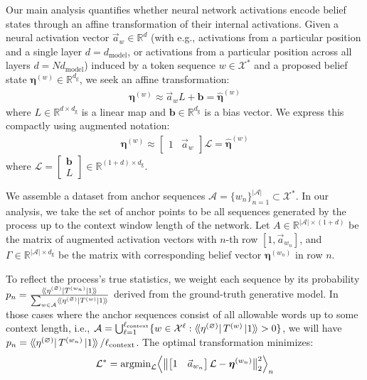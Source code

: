 \documentclass[prx,nofootinbib,onecolumn,showkeys,groupaddress,preprintnumbers,floatfix,
superscriptaddress]{revtex4-1}
\newcommand{\argmin}{\text{argmin}}
\newcommand{\Abet}{\mathcal{X}}
\newcommand{\dbra}[1]{\bra{ \! \langle #1}}
\newcommand{\dket}[1]{\ket{ #1 \rangle \!}}
\newcommand{\init}{\dbra{\eta^{(\varnothing)}}}
\newcommand{\act}[1][w]{\vec{a}_{#1}} %
\begin{document}
Our main analysis quantifies whether neural network activations encode belief states through an affine transformation of their internal activations. Given a neural activation vector $\act[w] \in \mathbb{R}^d$ (with e.g., activations from 
a particular position and
a single layer $d = d_\text{model}$, or 
activations from 
a particular position across all layers
$d = N d_\text{model}$)
induced by a token sequence $w \in \mathcal{X}^*$ and a proposed belief state $\boldsymbol{\eta}^{(w)} \in \mathbb{R}^{d_\text{g}}$, we seek an affine transformation:
%
\begin{align}
\boldsymbol{\eta}^{(w)} \approx \act[w] L + \boldsymbol{b} = \hat{\boldsymbol{\eta}}^{(w)}
\end{align}
%
where $L \in \mathbb{R}^{d \times d_\text{g}}$ is a linear map and $\boldsymbol{b} \in \mathbb{R}^{d_\text{g}}$ is a bias vector. We express this compactly using augmented notation:
%
\begin{align}
\boldsymbol{\eta}^{(w)} \approx \begin{bmatrix} 1 & \act[w] \end{bmatrix} \mathcal{L} = \hat{\boldsymbol{\eta}}^{(w)}
\end{align}
%
where $\mathcal{L} = \begin{bmatrix} \boldsymbol{b} \\ L \end{bmatrix} \in \mathbb{R}^{(1+d) \times d_\text{g}}$.


We assemble a dataset from anchor sequences $\mathcal{A} = \{w_n\}_{n=1}^{|\mathcal{A}|} \subset \mathcal{X}^*$. In our analysis, we take the set of anchor points to be all sequences generated by the process up to the context window length of the network. Let $A \in \mathbb{R}^{|\mathcal{A}| \times (1+d)}$ be the matrix of augmented activation vectors with $n$-th row $[1, \act[w_n]]$, and $\Gamma \in \mathbb{R}^{|\mathcal{A}| \times d_\text{g}}$ be the matrix with corresponding belief vector $\boldsymbol{\eta}^{(w_n)}$ in row $n$.

To reflect the process's true statistics, we weight each sequence by its probability %
$p_n = \frac{\dbra{\eta^{(\varnothing)}} T^{(w_n)} \dket{1}}{\sum_{w \in \mathcal{A}} \dbra{\eta^{(\varnothing)}} T^{(w)} \dket{1} }$
derived from the ground-truth generative model. 
In those cases where the anchor sequences consist of all allowable words up to some context length, i.e.,  $\mathcal{A} = \bigcup_{\ell=1}^{\ell_\text{context}} \{ w \in \Abet^\ell : \init T^{(w)} \dket{1} > 0\}$,
we will have 
$p_n = \dbra{\eta^{(\varnothing)}} T^{(w_n)} \dket{1} / \ell_\text{context}$.
%
The optimal transformation minimizes:
%
\begin{align}
\mathcal{L}^* = \argmin_{\mathcal{L}} \Bigl\langle \bigl\| \begin{bmatrix} 1 & \act[w_n] \end{bmatrix} \mathcal{L} - \boldsymbol{\eta}^{(w_n)} \bigr\|_2^2 \Bigr\rangle_{n}
\end{align}
\end{document}
